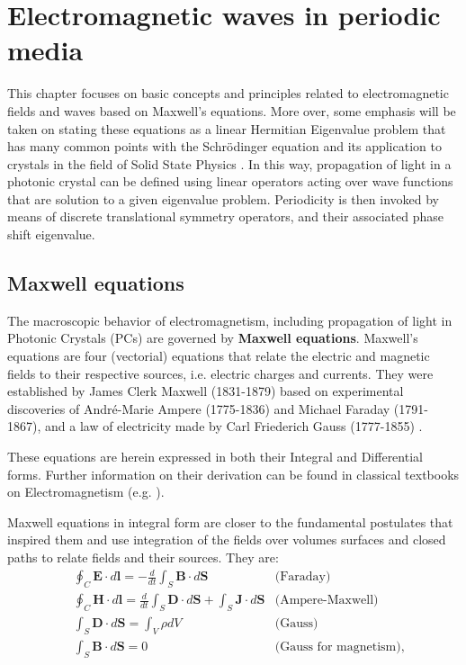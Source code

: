 \chapter{Electromagnetic waves in periodic media}
\label{ch:Electromagnetic waves in periodic media}

This chapter focuses on basic concepts and principles related to electromagnetic fields and waves based on Maxwell's equations. More over, some emphasis will be taken on stating these equations as a linear Hermitian Eigenvalue problem that has many common points with the Schr\"odinger equation and its application to crystals in the field of Solid State Physics \cite{Kittel2005}. 
In this way, propagation of light in a photonic crystal can be defined using linear operators acting over wave functions that are solution to a given eigenvalue problem.  Periodicity is then invoked by means of discrete translational symmetry operators, and their associated phase shift eigenvalue. 

\section{Maxwell equations}

The macroscopic behavior of electromagnetism, including propagation of light in Photonic Crystals (PCs) are governed by \textbf{Maxwell equations}. Maxwell's equations are four (vectorial) equations that relate the electric and magnetic fields to their respective sources, i.e. electric charges and currents. They were established by James Clerk Maxwell (1831-1879) based on experimental discoveries of Andr\'e-Marie Ampere (1775-1836) and Michael Faraday (1791-1867), and a law of electricity made by Carl Friederich Gauss (1777-1855) \cite{Jin2010}.

These equations are herein expressed in both their Integral and Differential forms. Further information on their derivation can be found in classical textbooks on Electromagnetism (e.g. \cite{Jackson1998}). 

Maxwell equations in integral form are closer to the fundamental postulates that inspired them and use integration of the fields over volumes surfaces and closed paths to relate fields and their sources. They are: 
\begin{align}
&\oint_C \mathbf{E}\cdot d\mathbf{l} = -\frac{d}{dt}\int_S \mathbf{B}\cdot d\mathbf{S} &\mbox{(Faraday)}\\
&\oint_C \mathbf{H}\cdot d\mathbf{l} = \frac{d}{dt}\int_S \mathbf{D}\cdot d\mathbf{S} + \int_S \mathbf{J}\cdot d\mathbf{S} &\mbox{(Ampere-Maxwell)}\\
&\int_S \mathbf{D}\cdot d\mathbf{S} = \int_V \rho dV &\mbox{(Gauss)} \label{eq:Gauss}\\
&\int_S \mathbf{B}\cdot d\mathbf{S} = 0 &\mbox{(Gauss for magnetism)},
\end{align}

